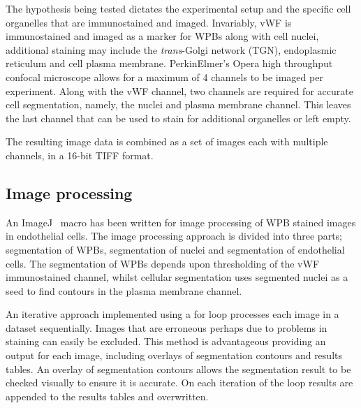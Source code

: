 The hypothesis being tested dictates the experimental setup and the specific cell organelles that are immunostained and imaged. Invariably, vWF is immunostained and imaged as a marker for WPBs along with cell nuclei, additional staining may include the \emph{trans}-Golgi network (TGN), endoplasmic reticulum and cell plasma membrane. PerkinElmer's Opera high throughput confocal microscope allows for a maximum of 4 channels to be imaged per experiment. Along with the vWF channel, two channels are required for accurate cell segmentation, namely, the nuclei and plasma membrane channel. This leaves the last channel that can be used to stain for additional organelles or left empty.

The resulting image data is combined as a set of images each with multiple channels, in a 16-bit TIFF format.

\subsection{Image processing}
An ImageJ~\cite{Schneider2012} macro has been written for image processing of WPB stained images in endothelial cells. The image processing approach is divided into three parts; segmentation of WPBs, segmentation of nuclei and segmentation of endothelial cells. The segmentation of WPBs depends upon thresholding of the vWF immunostained channel, whilst cellular segmentation uses segmented nuclei as a seed to find contours in the plasma membrane channel.

An iterative approach implemented using a for loop processes each image in a dataset sequentially. Images that are erroneous perhaps due to problems in staining can easily be excluded. This method is advantageous providing an output for each image, including overlays of segmentation contours and results tables. An overlay of segmentation contours allows the segmentation result to be checked visually to ensure it is accurate. On each iteration of the loop results are appended to the results tables and overwritten. 

